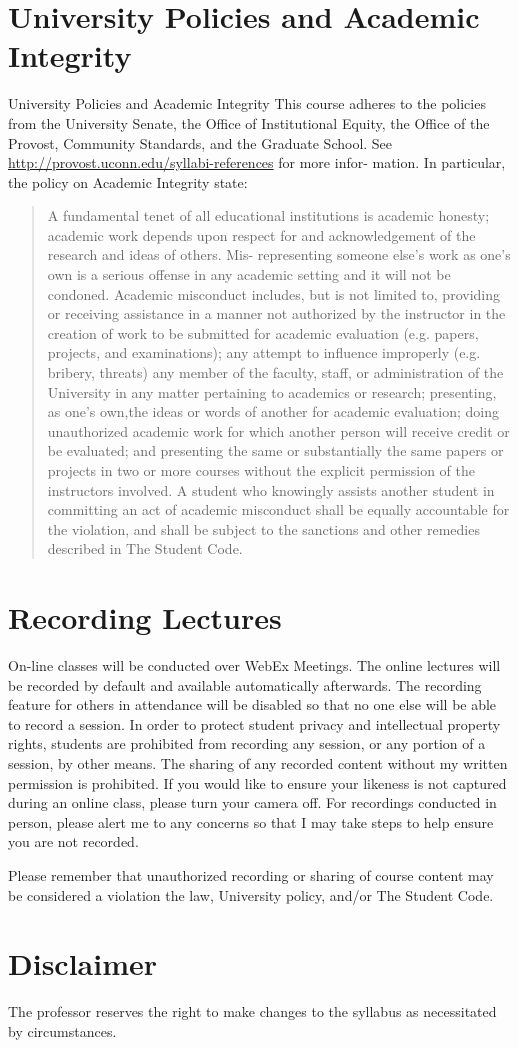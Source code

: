 \documentclass{article}
\begin{document}
\section*{University Policies and Academic Integrity}
  University Policies and Academic Integrity
This course adheres to the policies from the University Senate, the
Office of Institutional Equity, the Office of the Provost, Community
Standards, and the Graduate School. See
\url{http://provost.uconn.edu/syllabi-references}
for more infor- mation. In particular, the policy on Academic
Integrity state:
\begin{quote}
A fundamental tenet of all educational institutions is academic
honesty; academic work depends upon respect for and acknowledgement of
the research and ideas of others. Mis- representing someone else’s
work as one’s own is a serious offense in any academic setting and it
will not be condoned. Academic misconduct includes, but is not limited
to, providing or receiving assistance in a manner not authorized by
the instructor in the creation of work to be submitted for academic
evaluation (e.g. papers, projects, and examinations); any attempt to
influence improperly (e.g. bribery, threats) any member of the
faculty, staff, or administration of the University in any matter
pertaining to academics or research; presenting, as one’s own,the
ideas or words of another for academic evaluation; doing
unauthorized academic work for which another person will receive
credit or be evaluated; and presenting the same or substantially the
same papers or projects in two or more courses without the explicit
permission of the instructors involved. A student who knowingly
assists another student in committing an act of academic misconduct
shall be equally accountable for the violation, and shall be subject
to the sanctions and other remedies described in The Student Code.
\end{quote}

\section*{Recording Lectures}
On-line classes will be conducted over WebEx Meetings. The online
lectures will be recorded by default and available automatically
afterwards. The recording feature for others in attendance will be
disabled so that no one else will be able to record a session. In
order to protect student privacy and intellectual property rights,
students are prohibited from recording any session, or any portion of
a session, by other means. The sharing of any
recorded content without my written permission is prohibited. If you
would like to ensure your likeness is not captured during an online
class, please turn your camera off. For recordings conducted in
person, please alert me to any concerns so that I may take steps to
help ensure you are not recorded.

Please remember that unauthorized recording or sharing of course
content may be considered a violation the law, University policy,
and/or The Student Code.

\section*{Disclaimer}
The professor reserves the right to make changes to the syllabus as
necessitated by circumstances.


\end{document}
